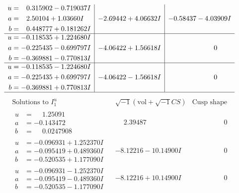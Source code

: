 \documentclass[1p]{elsarticle_modified}
\theoremstyle{definition}
\newcommand{\I}{\sqrt{-1}}
\begin{document}
$$\begin{array}{c|c|c}
\begin{aligned}
u &= \phantom{-}0.315902 - 0.719037 I \\
a &= \phantom{-}2.50104 + 1.03660 I \\
b &= \phantom{-}0.448777 + 0.181262 I\end{aligned}
 & -2.69442 + 4.06632 I & -0.58437 - 4.03909 I \\ \hline\begin{aligned}
u &= -0.118535 + 1.224680 I \\
a &= -0.225435 - 0.699797 I \\
b &= -0.369881 - 0.770813 I\end{aligned}
 & -4.06422 + 1.56618 I & \phantom{-0.000000 } 0 \\ \hline\begin{aligned}
u &= -0.118535 - 1.224680 I \\
a &= -0.225435 + 0.699797 I \\
b &= -0.369881 + 0.770813 I\end{aligned}
 & -4.06422 - 1.56618 I & \phantom{-0.000000 } 0\\
 \hline 
 \end{array}$$\newpage$$\begin{array}{c|c|c}  
\text{Solutions to }I^u_{1}& \I (\text{vol} + \sqrt{-1}CS) & \text{Cusp shape}\\
 \hline 
\begin{aligned}
u &= \phantom{-}1.25091\phantom{ +0.000000I} \\
a &= -0.143472\phantom{ +0.000000I} \\
b &= \phantom{-}0.0247908\phantom{ +0.000000I}\end{aligned}
 & \phantom{-}2.39487\phantom{ +0.000000I} & \phantom{-0.000000 } 0 \\ \hline\begin{aligned}
u &= -0.096931 + 1.252370 I \\
a &= -0.095419 + 0.489360 I \\
b &= -0.520535 + 1.177090 I\end{aligned}
 & -8.12216 - 10.14900 I & \phantom{-0.000000 } 0 \\ \hline\begin{aligned}
u &= -0.096931 - 1.252370 I \\
a &= -0.095419 - 0.489360 I \\
b &= -0.520535 - 1.177090 I\end{aligned}
 & -8.12216 + 10.14900 I & \phantom{-0.000000 } 0 \\ \hline\begin{aligned}

\end{aligned}
\end{array}$$
\end{document}
